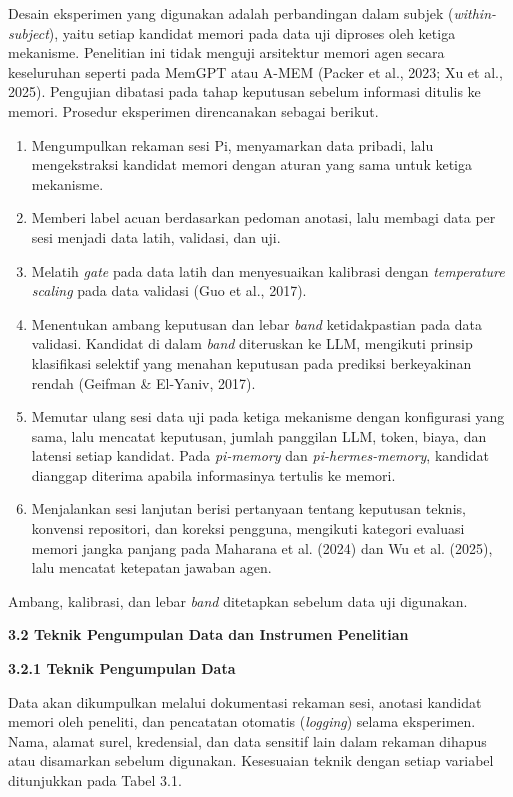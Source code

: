\documentclass[12pt,a4paper]{article}
\newcommand{\asing}[1]{\textit{#1}}
\newcommand{\pim}{\textit{pi-memory}}
\newcommand{\phm}{\textit{pi-hermes-memory}}
\newcommand{\subbab}[2]{%
  \par\vspace{0.8em}\phantomsection\label{#2}%
  \noindent\textbf{#1}\par\nopagebreak\vspace{0.3em}}
\newcommand{\subsubbab}[2]{%
  \par\vspace{0.5em}\phantomsection\label{#2}%
  \noindent\textbf{#1}\par\nopagebreak\vspace{0.2em}}
\begin{document}
Desain eksperimen yang digunakan adalah perbandingan dalam subjek (\asing{within-subject}), yaitu setiap kandidat memori pada data uji diproses oleh ketiga mekanisme. Penelitian ini tidak menguji arsitektur memori agen secara keseluruhan seperti pada MemGPT atau A-MEM (Packer et al., 2023; Xu et al., 2025). Pengujian dibatasi pada tahap keputusan sebelum informasi ditulis ke memori. Prosedur eksperimen direncanakan sebagai berikut.
\begin{enumerate}[leftmargin=1.25cm]
\item Mengumpulkan rekaman sesi Pi, menyamarkan data pribadi, lalu mengekstraksi kandidat memori dengan aturan yang sama untuk ketiga mekanisme.
\item Memberi label acuan berdasarkan pedoman anotasi, lalu membagi data per sesi menjadi data latih, validasi, dan uji.
\item Melatih \asing{gate} pada data latih dan menyesuaikan kalibrasi dengan \asing{temperature scaling} pada data validasi (Guo et al., 2017).
\item Menentukan ambang keputusan dan lebar \asing{band} ketidakpastian pada data validasi. Kandidat di dalam \asing{band} diteruskan ke LLM, mengikuti prinsip klasifikasi selektif yang menahan keputusan pada prediksi berkeyakinan rendah (Geifman \& El-Yaniv, 2017).
\item Memutar ulang sesi data uji pada ketiga mekanisme dengan konfigurasi yang sama, lalu mencatat keputusan, jumlah panggilan LLM, token, biaya, dan latensi setiap kandidat. Pada \pim{} dan \phm{}, kandidat dianggap diterima apabila informasinya tertulis ke memori.
\item Menjalankan sesi lanjutan berisi pertanyaan tentang keputusan teknis, konvensi repositori, dan koreksi pengguna, mengikuti kategori evaluasi memori jangka panjang pada Maharana et al. (2024) dan Wu et al. (2025), lalu mencatat ketepatan jawaban agen.
\end{enumerate}

Ambang, kalibrasi, dan lebar \asing{band} ditetapkan sebelum data uji digunakan.

\subbab{3.2 Teknik Pengumpulan Data dan Instrumen Penelitian}{sec:3.2}

\subsubbab{3.2.1 Teknik Pengumpulan Data}{sec:3.2.1}

Data akan dikumpulkan melalui dokumentasi rekaman sesi, anotasi kandidat memori oleh peneliti, dan pencatatan otomatis (\asing{logging}) selama eksperimen. Nama, alamat surel, kredensial, dan data sensitif lain dalam rekaman dihapus atau disamarkan sebelum digunakan. Kesesuaian teknik dengan setiap variabel ditunjukkan pada Tabel 3.1.
\end{document}
